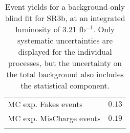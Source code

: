 \begin{table}
\begin{center}
{\begin{tabular*}{\textwidth}{@{\extracolsep{\fill}}lr}
        MC exp. Fakes events         & $0.13$              \\
        MC exp. MisCharge events         & $0.19$              \\
\noalign{\smallskip}\hline\noalign{\smallskip}
\end{tabular*}
}
\end{center}
\caption{Event yields for a background-only blind fit for SR3b, at an integrated luminosity of 3.21 fb$^{-1}$. Only systematic uncertainties are displayed for the individual processes, but the uncertainty on the total background also includes the statistical component.}
\label{tab:histfitter:yields:bgonly:SR3b}
\end{table}
%



